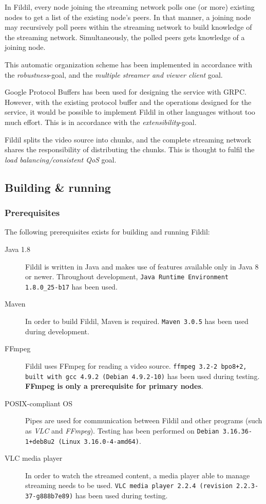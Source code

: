 \documentclass[10pt, a4paper]{article}
\begin{document}
In Fildil, every node joining the streaming network polls one (or more) existing
nodes to get a list of the existing node's peers. In that manner, a joining node
may recursively poll peers within the streaming network to build knowledge of
the streaming network. Simultaneously, the polled peers gets knowledge of a
joining node. 

This automatic organization scheme has been implemented in accordance with the
\emph{robustness}-goal, and the \emph{multiple streamer and viewer client}
goal.

Google Protocol Buffers has been used for designing the service with
GRPC. However, with the existing protocol buffer and the operations designed for
the service, it would be possible to implement Fildil in other languages without
too much effort. This is in accordance with the \emph{extensibility}-goal.

Fildil splits the video source into chunks, and the complete streaming network
shares the responsibility of distributing the chunks. This is thought to fulfil
the \emph{load balancing/consistent QoS} goal.

\subsection{Building \& running}
\label{sec:building-running}

\subsubsection{Prerequisites}

The following prerequisites exists for building and running Fildil:

\begin{description}
\item[Java 1.8] Fildil is written in Java and makes use of features available
  only in Java 8 or newer. Throughout development, \texttt{Java Runtime
    Environment 1.8.0\_25-b17} has been used.
\item[Maven] In order to build Fildil, Maven is required. \texttt{Maven 3.0.5}
  has been used during development.
\item[FFmpeg] Fildil uses FFmpeg for reading a video source. \texttt{ffmpeg
    3.2-2~bpo8+2, built with gcc 4.9.2 (Debian 4.9.2-10)} has been used
  during testing. \textbf{FFmpeg is only a prerequisite for primary nodes}.
\item[POSIX-compliant OS] Pipes are used for communication between Fildil and
  other programs (such as \emph{VLC} and \emph{FFmpeg}). Testing has been
  performed on \texttt{Debian 3.16.36-1+deb8u2 (Linux 3.16.0-4-amd64)}.
\item[VLC media player] In order to watch the streamed content, a media player
  able to manage streaming needs to be used. \texttt{VLC media player 2.2.4
    (revision 2.2.3-37-g888b7e89)} has been used during testing.
\end{description}
\end{document}
